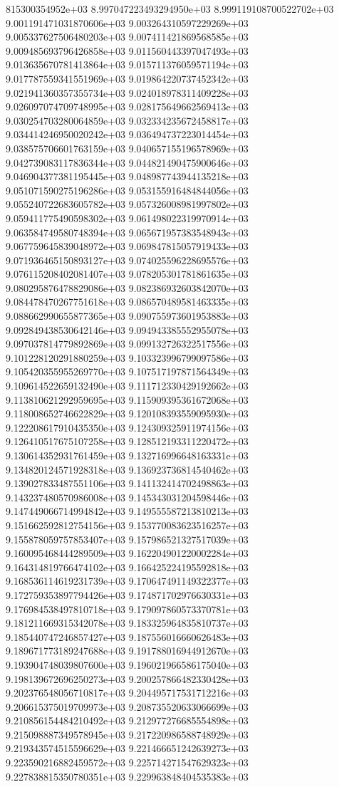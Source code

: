 815300354952e+03	8.997047223493294950e+03	8.999119108700522702e+03	9.001191471031870606e+03	9.003264310597229269e+03	9.005337627506480203e+03	9.007411421869568585e+03	9.009485693796426858e+03	9.011560443397047493e+03	9.013635670781413864e+03	9.015711376059571194e+03	9.017787559341551969e+03	9.019864220737452342e+03	9.021941360357355734e+03	9.024018978311409228e+03	9.026097074709748995e+03	9.028175649662569413e+03	9.030254703280064859e+03	9.032334235672458817e+03	9.034414246950020242e+03	9.036494737223014454e+03	9.038575706601763159e+03	9.040657155196578969e+03	9.042739083117836344e+03	9.044821490475900646e+03	9.046904377381195445e+03	9.048987743944135218e+03	9.051071590275196286e+03	9.053155916484844056e+03	9.055240722683605782e+03	9.057326008981997802e+03	9.059411775490598302e+03	9.061498022319970914e+03	9.063584749580748394e+03	9.065671957383548943e+03	9.067759645839048972e+03	9.069847815057919433e+03	9.071936465150893127e+03	9.074025596228695576e+03	9.076115208402081407e+03	9.078205301781861635e+03	9.080295876478829086e+03	9.082386932603842070e+03	9.084478470267751618e+03	9.086570489581463335e+03	9.088662990655877365e+03	9.090755973601953883e+03	9.092849438530642146e+03	9.094943385552955078e+03	9.097037814779892869e+03	9.099132726322517556e+03	9.101228120291880259e+03	9.103323996799097586e+03	9.105420355955269770e+03	9.107517197871564349e+03	9.109614522659132490e+03	9.111712330429192662e+03	9.113810621292959695e+03	9.115909395361672068e+03	9.118008652746622829e+03	9.120108393559095930e+03	9.122208617910435350e+03	9.124309325911974156e+03	9.126410517675107258e+03	9.128512193311220472e+03	9.130614352931761459e+03	9.132716996648163331e+03	9.134820124571928318e+03	9.136923736814540462e+03	9.139027833487551106e+03	9.141132414702498863e+03	9.143237480570986008e+03	9.145343031204598446e+03	9.147449066714994842e+03	9.149555587213810213e+03	9.151662592812754156e+03	9.153770083623516257e+03	9.155878059757853407e+03	9.157986521327517039e+03	9.160095468444289509e+03	9.162204901220002284e+03	9.164314819766474102e+03	9.166425224195592818e+03	9.168536114619231739e+03	9.170647491149322377e+03	9.172759353897794426e+03	9.174871702976630331e+03	9.176984538497810718e+03	9.179097860573370781e+03	9.181211669315342078e+03	9.183325964835810737e+03	9.185440747246857427e+03	9.187556016660626483e+03	9.189671773189247688e+03	9.191788016944912670e+03	9.193904748039807600e+03	9.196021966586175040e+03	9.198139672696250273e+03	9.200257866482330428e+03	9.202376548056710817e+03	9.204495717531712216e+03	9.206615375019709973e+03	9.208735520633066699e+03	9.210856154484210492e+03	9.212977276685554898e+03	9.215098887349578945e+03	9.217220986588748929e+03	9.219343574515596629e+03	9.221466651242639273e+03	9.223590216882459572e+03	9.225714271547629323e+03	9.227838815350780351e+03	9.229963848404535383e+03
